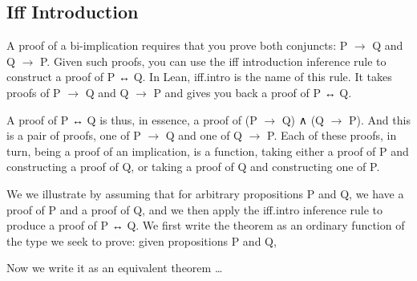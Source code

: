 \documentclass[letterpaper,10pt,english]{sphinxmanual}
\begin{document}
\subsection{Iff Introduction}
\label{\detokenize{15-proofs:iff-introduction}}
A proof of a bi-implication requires that you prove both conjuncts: P
\(\rightarrow\) Q and Q \(\rightarrow\) P. Given such proofs, you can use the iff introduction
inference rule to construct a proof of P ↔ Q.  In Lean, iff.intro is
the name of this rule.  It takes proofs of P \(\rightarrow\) Q and Q \(\rightarrow\) P and gives
you back a proof of P ↔ Q.

A proof of P ↔ Q is thus, in essence, a proof of (P \(\rightarrow\) Q) ∧ (Q \(\rightarrow\)
P). And this is a pair of proofs, one of P \(\rightarrow\) Q and one of Q \(\rightarrow\) P. Each
of these proofs, in turn, being a proof of an implication, is a
function, taking either a proof of P and constructing a proof of Q, or
taking a proof of Q and constructing one of P.

We we illustrate by assuming that for arbitrary propositions P and Q,
we have a proof of P and a proof of Q, and we then apply the iff.intro
inference rule to produce a proof of P ↔ Q. We first write the theorem
as an ordinary function of the type we seek to prove: given
propositions P and Q,

\begin{sphinxVerbatim}[commandchars=\\\{\}]
                
    
\end{sphinxVerbatim}

Now we write it as an equivalent theorem …

\begin{sphinxVerbatim}[commandchars=\\\{\}]
                 
             
      
\end{sphinxVerbatim}
\end{document}

